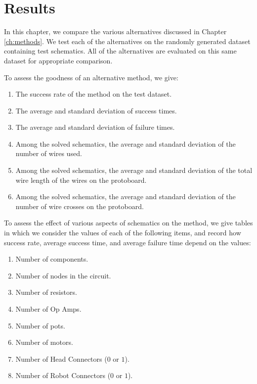 
\chapter{Results}
\label{ch:results}

In this chapter, we compare the various alternatives discussed in Chapter
\ref{ch:methods}. We test each of the alternatives on the randomly generated
dataset
containing \q test schematics. All of the alternatives are evaluated on this
same dataset for appropriate comparison.

To assess the goodness of an alternative method, we give:
\begin{enumerate}
\item The success rate of the method on the test dataset.
\item The average and standard deviation of success times.
\item The average and standard deviation of failure times.
\item Among the solved schematics, the average and standard deviation of the
number of wires used.
\item Among the solved schematics, the average and standard deviation of the
total wire length of the wires on the protoboard.
\item Among the solved schematics, the average and standard deviation of the
number of wire crosses on the protoboard.
\end{enumerate}

To assess the effect of various aspects of schematics on the method, we give
tables in which we consider the values of each of the following items, and
record how success rate, average success time, and average failure time depend
on the values:
\begin{enumerate}
\item Number of components.
\item Number of nodes in the circuit.
\item Number of resistors.
\item Number of Op Amps.
\item Number of pots.
\item Number of motors.
\item Number of Head Connectors ($0$ or $1$).
\item Number of Robot Connectors ($0$ or $1$).
\end{enumerate}

